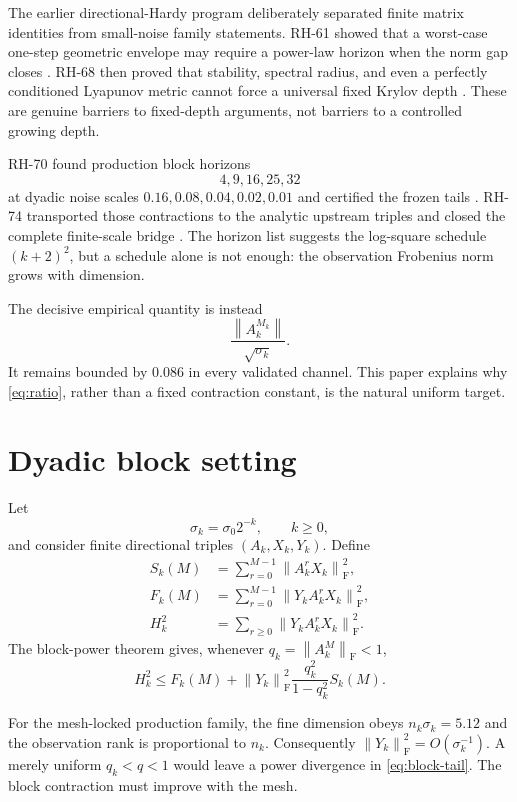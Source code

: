\documentclass[11pt]{article}
\newcommand{\norm}[1]{\left\lVert#1\right\rVert}
\newcommand{\F}{\mathrm F}
\begin{document}
The earlier directional-Hardy program deliberately separated finite matrix
identities from small-noise family statements.  RH-61 showed that a worst-case
one-step geometric envelope may require a power-law horizon when the norm gap
closes \citep{WangHorizon2026}.  RH-68 then proved that stability, spectral
radius, and even a perfectly conditioned Lyapunov metric cannot force a
universal fixed Krylov depth \citep{WangBarrier2026}.  These are genuine
barriers to fixed-depth arguments, not barriers to a controlled growing depth.

RH-70 found production block horizons
\[
 4,9,16,25,32
\]
at dyadic noise scales $0.16,0.08,0.04,0.02,0.01$ and certified the frozen
tails \citep{WangFrozen2026}.  RH-74 transported those contractions to the
analytic upstream triples and closed the complete finite-scale bridge
\citep{WangBridge2026}.  The horizon list suggests the log-square schedule
$(k+2)^2$, but a schedule alone is not enough: the observation Frobenius norm
grows with dimension.

The decisive empirical quantity is instead
\begin{equation}
 \frac{\norm{A_k^{M_k}}}{\sqrt{\sigma_k}}.
 \label{eq:ratio}
\end{equation}
It remains bounded by $0.086$ in every validated channel.  This paper explains
why \eqref{eq:ratio}, rather than a fixed contraction constant, is the natural
uniform target.

\section{Dyadic block setting}

Let
\[
 \sigma_k=\sigma_0 2^{-k},\qquad k\ge0,
\]
and consider finite directional triples $(A_k,X_k,Y_k)$.  Define
\begin{align}
 S_k(M)&=\sum_{r=0}^{M-1}\norm{A_k^rX_k}_{\F}^2,
 \label{eq:source-block}\\
 F_k(M)&=\sum_{r=0}^{M-1}\norm{Y_kA_k^rX_k}_{\F}^2,
 \label{eq:finite-block}\\
 H_k^2&=\sum_{r\ge0}\norm{Y_kA_k^rX_k}_{\F}^2.
 \label{eq:hardy}
\end{align}
The block-power theorem gives, whenever $q_k=\norm{A_k^M}_{\F}<1$,
\begin{equation}
 H_k^2\le F_k(M)
 +\norm{Y_k}_{\F}^2\frac{q_k^2}{1-q_k^2}S_k(M).
 \label{eq:block-tail}
\end{equation}

For the mesh-locked production family, the fine dimension obeys
$n_k\sigma_k=5.12$ and the observation rank is proportional to $n_k$.
Consequently $\norm{Y_k}_{\F}^2=O(\sigma_k^{-1})$.  A merely uniform
$q_k<q<1$ would leave a power divergence in \eqref{eq:block-tail}.  The block
contraction must improve with the mesh.
\end{document}

